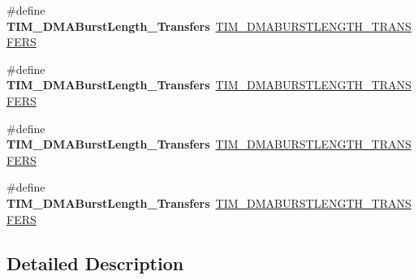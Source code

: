\begin{DoxyCompactItemize}
\#define {\bfseries T\+I\+M\+\_\+\+D\+M\+A\+Burst\+Length\+\_\+Transfers}~\hyperlink{group___t_i_m___d_m_a___burst___length_ga98a4d88c533178bc1b4347e4c5ce815a}{T\+I\+M\+\_\+\+D\+M\+A\+B\+U\+R\+S\+T\+L\+E\+N\+G\+T\+H\+\_\+T\+R\+A\+N\+S\+F\+E\+RS}
\item 
\mbox{\label{group___h_a_l___t_i_m___aliased___defines_gafb644e6033f7b46c602b02754b69fde0}} 
\#define {\bfseries T\+I\+M\+\_\+\+D\+M\+A\+Burst\+Length\+\_\+Transfers}~\hyperlink{group___t_i_m___d_m_a___burst___length_gaf4b2a1fe12c52272544c21e17de1ed90}{T\+I\+M\+\_\+\+D\+M\+A\+B\+U\+R\+S\+T\+L\+E\+N\+G\+T\+H\+\_\+T\+R\+A\+N\+S\+F\+E\+RS}
\item 
\mbox{\label{group___h_a_l___t_i_m___aliased___defines_ga5b2c97f650a3c1726965187d852b8cc5}} 
\#define {\bfseries T\+I\+M\+\_\+\+D\+M\+A\+Burst\+Length\+\_\+Transfers}~\hyperlink{group___t_i_m___d_m_a___burst___length_gad31c1fca7ed436a53efc4f290144584d}{T\+I\+M\+\_\+\+D\+M\+A\+B\+U\+R\+S\+T\+L\+E\+N\+G\+T\+H\+\_\+T\+R\+A\+N\+S\+F\+E\+RS}
\item 
\mbox{\label{group___h_a_l___t_i_m___aliased___defines_gaed9f2afef174079f6eb6927abd995b9b}} 
\#define {\bfseries T\+I\+M\+\_\+\+D\+M\+A\+Burst\+Length\+\_\+Transfers}~\hyperlink{group___t_i_m___d_m_a___burst___length_gabb6f72b02ee1c8855de241cb0713e2ca}{T\+I\+M\+\_\+\+D\+M\+A\+B\+U\+R\+S\+T\+L\+E\+N\+G\+T\+H\+\_\+T\+R\+A\+N\+S\+F\+E\+RS}
\end{DoxyCompactItemize}


\subsection{Detailed Description}
